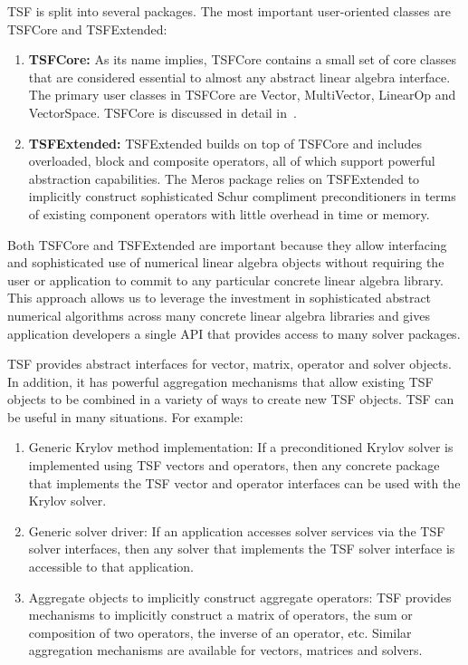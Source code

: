 \documentclass[12pt,relax]{TrilinosOverview}
\begin{document}
TSF is split into several packages.  The most important user-oriented
classes are TSFCore and TSFExtended:
\begin{enumerate}
\item {\bf TSFCore:} As its name implies, TSFCore contains a small set
of core classes that are considered essential to almost any abstract
linear algebra interface.  The primary user classes in TSFCore are
Vector, MultiVector, LinearOp and VectorSpace. TSFCore is discussed in
detail in~\cite{TSFCore}.
\item {\bf TSFExtended:} TSFExtended builds on top of TSFCore and
includes overloaded, block and composite operators, all of
which support powerful abstraction capabilities.  The Meros package
relies on TSFExtended to implicitly construct sophisticated
Schur compliment preconditioners in terms of existing component
operators with little overhead in time or memory.
\end{enumerate}

Both TSFCore and TSFExtended are important because they allow
interfacing and sophisticated use of numerical linear algebra objects
without requiring the user or application to commit to any particular
concrete linear algebra library.  This approach allows us to leverage
the investment in sophisticated abstract numerical algorithms across
many concrete linear algebra libraries and gives application
developers a single API that provides access to many solver packages.

TSF provides abstract interfaces for vector, matrix, operator and 
solver objects.  In addition, it has powerful aggregation mechanisms 
that allow existing TSF objects to be combined in a variety of ways 
to create new TSF objects.  TSF can be useful in many situations.  
For example:
\begin{enumerate}

\item Generic Krylov method implementation:  If a preconditioned Krylov solver 
is implemented using TSF vectors and operators, then any concrete package 
that implements the TSF vector and operator interfaces can be used 
with the Krylov solver.

\item Generic solver driver:  If an application accesses solver 
services via the TSF solver interfaces, then any solver that 
implements the TSF solver interface is accessible to that application.

\item Aggregate objects to implicitly construct aggregate operators: 
TSF provides mechanisms to implicitly construct a matrix of operators, 
the sum or composition of two operators, the inverse of an operator, 
etc.  Similar aggregation mechanisms are available for vectors, matrices
and solvers.

\end{enumerate}
\end{document}
